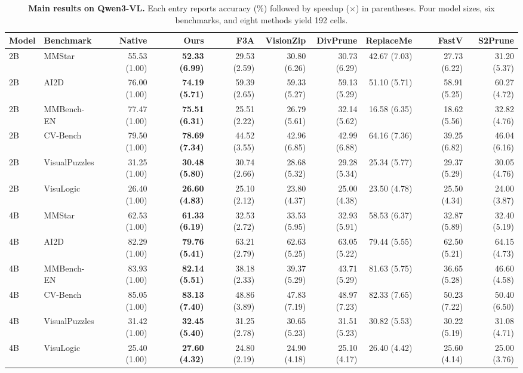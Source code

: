 \documentclass[10pt,a4paper,landscape]{article}
\begin{document}
\begin{table}[!ht]\centering
\caption{\textbf{Main results on Qwen3-VL.} Each entry reports accuracy (\%) followed by speedup ($\times$) in parentheses. Four model sizes, six benchmarks, and eight methods yield 192 cells.}
\small
\begin{tabular}{@{}llrrrrrrrr@{}}\toprule
Model & Benchmark & Native & Ours & F3A & VisionZip & DivPrune & ReplaceMe & FastV & S2Prune\\\midrule
2B & MMStar & 55.53 (1.00) & \textbf{52.33 (6.99)} & 29.53 (2.59) & 30.80 (6.26) & 30.73 (6.29) & 42.67 (7.03) & 27.73 (6.22) & 31.20 (5.37)\\
2B & AI2D & 76.00 (1.00) & \textbf{74.19 (5.71)} & 59.39 (2.65) & 59.33 (5.27) & 59.13 (5.29) & 51.10 (5.71) & 58.91 (5.25) & 60.27 (4.72)\\
2B & MMBench-EN & 77.47 (1.00) & \textbf{75.51 (6.31)} & 25.51 (2.22) & 26.79 (5.61) & 32.14 (5.62) & 16.58 (6.35) & 18.62 (5.56) & 32.82 (4.76)\\
2B & CV-Bench & 79.50 (1.00) & \textbf{78.69 (7.34)} & 44.52 (3.55) & 42.96 (6.85) & 42.99 (6.88) & 64.16 (7.36) & 39.25 (6.82) & 46.04 (6.16)\\
2B & VisualPuzzles & 31.25 (1.00) & \textbf{30.48 (5.80)} & 30.74 (2.66) & 28.68 (5.32) & 29.28 (5.34) & 25.34 (5.77) & 29.37 (5.29) & 30.05 (4.76)\\
2B & VisuLogic & 26.40 (1.00) & \textbf{26.60 (4.83)} & 25.10 (2.12) & 23.80 (4.37) & 25.00 (4.38) & 23.50 (4.78) & 25.50 (4.34) & 24.00 (3.87)\\
\midrule
4B & MMStar & 62.53 (1.00) & \textbf{61.33 (6.19)} & 32.53 (2.72) & 33.53 (5.95) & 32.93 (5.91) & 58.53 (6.37) & 32.87 (5.89) & 32.40 (5.19)\\
4B & AI2D & 82.29 (1.00) & \textbf{79.76 (5.41)} & 63.21 (2.79) & 62.63 (5.25) & 63.05 (5.22) & 79.44 (5.55) & 62.50 (5.21) & 64.15 (4.73)\\
4B & MMBench-EN & 83.93 (1.00) & \textbf{82.14 (5.51)} & 38.18 (2.33) & 39.37 (5.29) & 43.71 (5.29) & 81.63 (5.75) & 36.65 (5.28) & 46.60 (4.58)\\
4B & CV-Bench & 85.05 (1.00) & \textbf{83.13 (7.40)} & 48.86 (3.89) & 47.83 (7.19) & 48.97 (7.23) & 82.33 (7.65) & 50.23 (7.22) & 50.40 (6.50)\\
4B & VisualPuzzles & 31.42 (1.00) & \textbf{32.45 (5.40)} & 31.25 (2.78) & 30.65 (5.23) & 31.51 (5.23) & 30.82 (5.53) & 30.22 (5.19) & 31.08 (4.71)\\
4B & VisuLogic & 25.40 (1.00) & \textbf{27.60 (4.32)} & 24.80 (2.19) & 24.90 (4.18) & 25.10 (4.17) & 26.40 (4.42) & 25.60 (4.14) & 25.00 (3.76)\\

\end{tabular}
\end{table}
\end{document}

